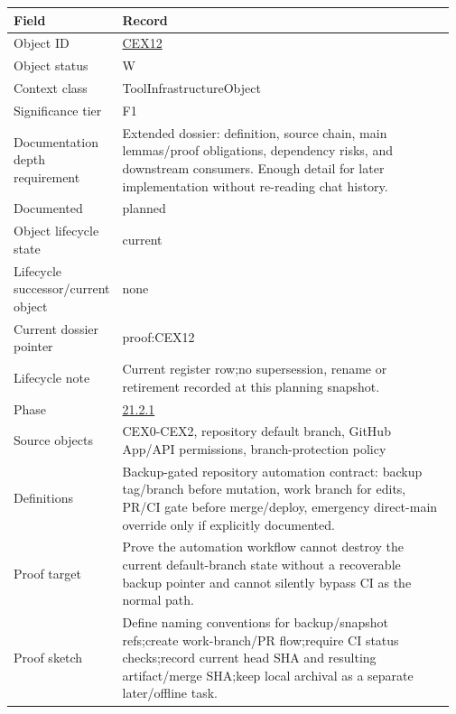 \begin{longtable}{L{0.16\linewidth} L{0.81\linewidth}}
\hline
\textbf{Field} & \textbf{Record}\\
\hline
Object ID & \hyperlink{object-row-CEX12}{CEX12}\\
\hline\addlinespace[0.20em]
Object status & W\\
\hline\addlinespace[0.20em]
Context class & ToolInfrastructureObject\\
\hline\addlinespace[0.20em]
Significance tier & F1\\
\hline\addlinespace[0.20em]
Documentation depth requirement & Extended dossier: definition, source chain, main lemmas/\allowbreak{}proof obligations, dependency risks, and downstream consumers. Enough detail for later implementation without re-reading chat history.\\
\hline\addlinespace[0.20em]
Documented & planned\\
\hline\addlinespace[0.20em]
Object lifecycle state & current\\
\hline\addlinespace[0.20em]
Lifecycle successor/\allowbreak{}current object & none\\
\hline\addlinespace[0.20em]
Current dossier pointer & proof:CEX12\\
\hline\addlinespace[0.20em]
Lifecycle note & Current register row;\newline no supersession, rename or retirement recorded at this planning snapshot.\\
\hline\addlinespace[0.20em]
Phase & \hyperlink{phase-row-21-2-1}{21.2.1}\\
\hline\addlinespace[0.20em]
Source objects & CEX0-CEX2, repository default branch, GitHub App/\allowbreak{}API permissions, branch-protection policy\\
\hline\addlinespace[0.20em]
Definitions & Backup-gated repository automation contract: backup tag/\allowbreak{}branch before mutation, work branch for edits, PR/\allowbreak{}CI gate before merge/\allowbreak{}deploy, emergency direct-main override only if explicitly documented.\\
\hline\addlinespace[0.20em]
Proof target & Prove the automation workflow cannot destroy the current default-branch state without a recoverable backup pointer and cannot silently bypass CI as the normal path.\\
\hline\addlinespace[0.20em]
Proof sketch & Define naming conventions for backup/\allowbreak{}snapshot refs;\newline create work-branch/\allowbreak{}PR flow;\newline require CI status checks;\newline record current head SHA and resulting artifact/\allowbreak{}merge SHA;\newline keep local archival as a separate later/\allowbreak{}offline task.\\

\end{longtable}

